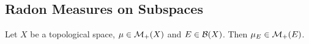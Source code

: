 \documentclass{book}
\begin{document}
	
	
	







	



































	\subsection{Radon Measures on Subspaces}
	
	\begin{ex} 
		Let $X$ be a topological space, $\mu \in \mathcal{M}_+(X)$ and $E \in \mathcal{B}(X)$. Then $\mu_E \in \mathcal{M}_+(E)$.
	\end{ex}
\end{document}
